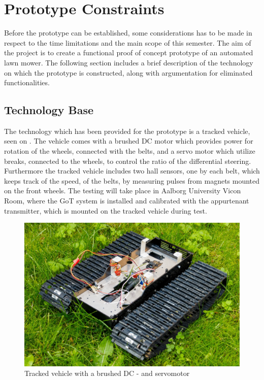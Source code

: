 \section{Prototype Constraints}
Before the prototype can be established, some considerations has to be made in respect to the time limitations and the main scope of this semester. The aim of the project is to create a functional proof of concept prototype of an automated lawn mower. The following section includes a brief description of the technology on which the prototype is constructed, along with argumentation for eliminated functionalities.

\subsection{Technology Base}
The technology which has been provided for the prototype is a tracked vehicle, seen on . The vehicle comes with a brushed DC motor which provides power for rotation of the wheels, connected with the belts, and a servo motor which utilize breaks, connected to the wheels, to control the ratio of the differential steering. Furthermore the tracked vehicle includes two hall sensors, one by each belt, which keeps track of the speed, of the belts, by measuring pulses from magnets mounted on the front wheels. The testing will take place in Aalborg University Vicon Room, where the GoT system is installed and calibrated with the appurtenant transmitter, which is mounted on the tracked vehicle during test.

\begin{figure}[H]
	\centering
	\includegraphics[scale=0.1]{figures/BeltVehicle.jpg}
	\flushleft
	\caption{Tracked vehicle with a brushed DC - and servomotor}
	\label{TrackedVehicle}
\end{figure}

